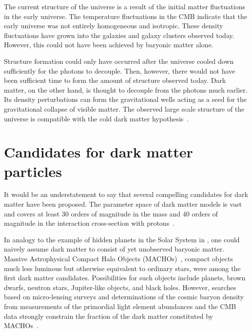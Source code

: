 The current structure of the universe is a result of the initial matter fluctuations in the early universe.
The temperature fluctuations in the CMB indicate that the early universe was not entirely homogeneous and isotropic. These density fluctuations have grown into the galaxies and galaxy clusters observed today. However, this could not have been achieved by baryonic matter alone.

Structure formation could only have occurred after the universe cooled down sufficiently for the photons to decouple. Then, however, there would not have been sufficient time to form the amount of structure observed today. Dark matter, on the other hand, is thought to decouple from the photons much earlier. Its density perturbations can form the gravitational wells acting as a seed for the gravitational collapse of visible matter. The observed large scale structure of the universe is compatible with the cold dark matter hypothesis~\cite{Blumenthal1984}.


\section{Candidates for dark matter particles}
\label{sec:dm:candidates}
It would be an understatement to say that several compelling candidates for dark matter have been proposed. The parameter space of dark matter models is vast and covers at least \num{30} orders of magnitude in the mass and \num{40} orders of magnitude in the interaction cross-section with protons~\cite{Ibarra2015}.

In analogy to the example of hidden planets in the Solar System in , one could naively assume dark matter to consist of yet unobserved baryonic matter.
Massive Astrophysical Compact Halo Objects (MACHOs)~\cite{Griest1993}, compact objects much less luminous but otherwise equivalent to ordinary stars, were among the first dark matter candidates. Possibilities for such objects include planets, brown dwarfs, neutron stars, Jupiter-like objects, and black holes. However, searches based on micro-lensing surveys and determinations of the cosmic baryon density from measurements of the primordial light element abundances and the CMB data strongly constrain the fraction of the dark matter constituted by MACHOs~\cite{Bertone2018}.

